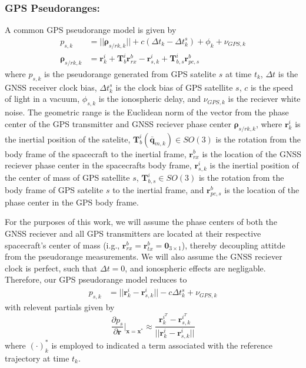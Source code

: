 \documentclass[letterpaper, submit]{AAS}			%
\begin{document}
\subsubsection{GPS Pseudoranges:}
A common GPS pseudorange model is given by \cite{Tapley_2004, Craft_2020}
\begin{align}
	p_{s,k} &= ||\boldsymbol{\rho}_{s/rk,k}|| + c(\Delta t_k - \Delta t_k^s) + \phi_k + \nu_{GPS,k} \\
	\boldsymbol{\rho}_{s/rk,k} &= \mathbf{r}_k^i + \mathbf{T}_b^i\mathbf{r}_{rx}^b - \mathbf{r}_{s,k}^i + \mathbf{T}_{b,s}^i\mathbf{r}_{pc,s}^b
\end{align}
where $p_{s,k}$ is the pseudorange generated from GPS satelite $s$ at time $t_k$, $\Delta t$ is the GNSS receiver clock bias, $\Delta t_k^s$ is the clock bias of GPS satellite $s$, $c$ is the speed of light in a vacuum, $\phi_{s,k}$ is the ionospheric delay, and $\nu_{GPS,k}$ is the reciever white noise. The geometric range is the Euclidean norm of the vector from the phase center of the GPS transmitter and GNSS reciever phase center $\boldsymbol{\rho}_{s/rk,k}$, where $\mathbf{r}_k^i$ is the inertial position of the satelite, $\mathbf{T}_b^i(\bar{\mathbf{q}}_{m,k}) \in SO(3)$ is the rotation from the body frame of the spacecraft to the inertial frame, $\mathbf{r}_{rx}^b$ is the location of the GNSS reciever phase center in the spacecrafts body frame, $\mathbf{r}_{s,k}^i$ is the inertial position of the center of mass of GPS satellite $s$, $\mathbf{T}_{b,s}^i\in SO(3)$ is the rotation from the body frame of GPS satelite $s$ to the inertial frame, and $\mathbf{r}_{pc,s}^b$ is the location of the phase center in the GPS body frame.

For the purposes of this work, we will assume the phase centers of both the GNSS reciever and all GPS transmitters are located at their respective spacecraft's center of mass (i.g., $\mathbf{r}_{rx}^b = \mathbf{r}_{tx}^b = \mathbf{0}_{3\times1}$), thereby decoupling attitde from the pseudorange measurements. We will also assume the GNSS reciever clock is perfect, such that $\Delta t = 0$, and ionospheric effects are negligable. Therefore, our GPS pseudorange model reduces to
\begin{align}
	p_{s,k} &= ||\mathbf{r}_k^i - \mathbf{r}_{s,k}^i|| - c\Delta t_k^s + \nu_{GPS,k}
\end{align}
with relevent partials given by
\begin{equation}
	\frac{\partial p_s}{\partial \mathbf{r}}\bigg|_{\mathbf{x}=\mathbf{x}^*} \approx \frac{\mathbf{r}_k^{i^T} - \mathbf{r}_{s,k}^{i^T}}{||\mathbf{r}_k^i - \mathbf{r}_{s,k}^i||}
\end{equation}
where $(\cdot)^*_k$ is employed to indicated a term associated with the reference trajectory at time $t_k$.
\end{document}
